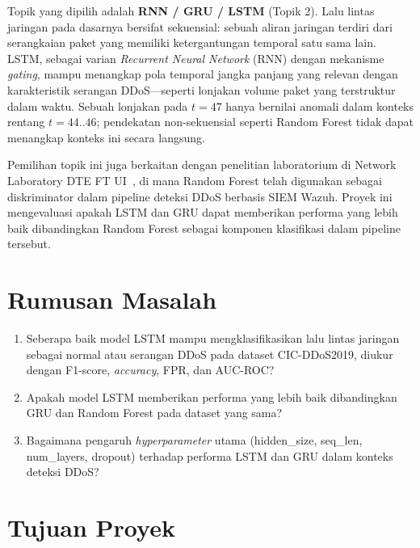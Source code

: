 \documentclass[11pt,a4paper,oneside]{report}
\begin{document}
Topik yang dipilih adalah \textbf{RNN / GRU / LSTM} (Topik 2). Lalu lintas jaringan pada dasarnya bersifat sekuensial: sebuah aliran jaringan terdiri dari serangkaian paket yang memiliki ketergantungan temporal satu sama lain. LSTM, sebagai varian \textit{Recurrent Neural Network} (RNN) dengan mekanisme \textit{gating}, mampu menangkap pola temporal jangka panjang yang relevan dengan karakteristik serangan DDoS---seperti lonjakan volume paket yang terstruktur dalam waktu. Sebuah lonjakan pada $t=47$ hanya bernilai anomali dalam konteks rentang $t=44..46$; pendekatan non-sekuensial seperti Random Forest tidak dapat menangkap konteks ini secara langsung.

Pemilihan topik ini juga berkaitan dengan penelitian laboratorium di Network Laboratory DTE FT UI~\cite{breiman2001}, di mana Random Forest telah digunakan sebagai diskriminator dalam pipeline deteksi DDoS berbasis SIEM Wazuh. Proyek ini mengevaluasi apakah LSTM dan GRU dapat memberikan performa yang lebih baik dibandingkan Random Forest sebagai komponen klasifikasi dalam pipeline tersebut.

\section{Rumusan Masalah}

\begin{enumerate}[label=RM\arabic*.,leftmargin=*]
    \item Seberapa baik model LSTM mampu mengklasifikasikan lalu lintas jaringan sebagai normal atau serangan DDoS pada dataset CIC-DDoS2019, diukur dengan F1-score, \textit{accuracy}, FPR, dan AUC-ROC?
    \item Apakah model LSTM memberikan performa yang lebih baik dibandingkan GRU dan Random Forest pada dataset yang sama?
    \item Bagaimana pengaruh \textit{hyperparameter} utama (hidden\_size, seq\_len, num\_layers, dropout) terhadap performa LSTM dan GRU dalam konteks deteksi DDoS?
\end{enumerate}

\section{Tujuan Proyek}
\end{document}
